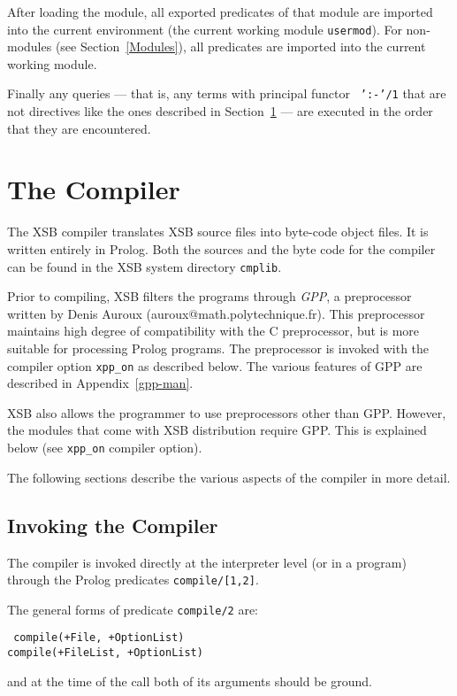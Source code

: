 After loading the module, all exported predicates of that module are
imported into the current environment (the current working
module {\tt usermod}).  For non-modules (see Section~\ref{Modules}),
all predicates are imported into the current working module.

Finally any queries --- that is, any terms with principal functor {\tt
':-'/1} that are not directives like the ones described in
Section~\ref{the_compiler} --- are executed in the order that they are
encountered.

\section{The Compiler} \label{the_compiler} 

The XSB compiler translates XSB source files into
byte-code object files.  It is written entirely in Prolog.
Both the sources and the byte code
for the compiler can be found in the XSB system directory
{\tt cmplib}.

Prior to compiling, XSB filters the programs through \emph{GPP}, a 
preprocessor written by Denis Auroux (auroux@math.polytechnique.fr).
This preprocessor maintains high degree of compatibility with the C
preprocessor, but is more suitable for processing Prolog programs.
The preprocessor is invoked with the compiler option \verb|xpp_on|
as described below. The various features of GPP are described in
Appendix~\ref{gpp-man}.

XSB also allows the programmer to use preprocessors other than GPP.
However, the modules that come with XSB distribution require GPP.
This is explained below (see \verb|xpp_on| compiler option).

The following sections describe the various aspects of the compiler 
in more detail.


\subsection{Invoking the Compiler} \label{compiler_invoking}

The compiler is invoked directly at the interpreter level (or in a 
program) through the Prolog predicates {\tt compile/[1,2]}.  

The general forms of predicate {\tt compile/2} are:
\begin{center}{\tt	
	compile(+File, +OptionList) \\
	compile(+FileList, +OptionList)
}
\end{center}
and at the time of the call both of its arguments should be ground.

